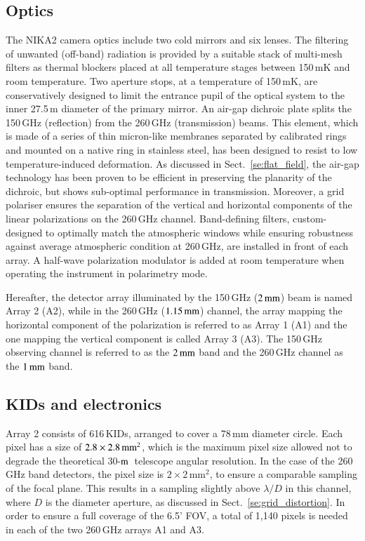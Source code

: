 \documentclass[traditionalabstract]{aa}
\newcommand{\trentemetre}{30-$\rm{m}$}
\newcommand{\lp}[1]{#1}
\newcommand{\rev}[1]{#1}
\begin{document}
\subsection{Optics}
\label{se:instru_optics}
The NIKA2 camera optics include two cold mirrors and six lenses. The
filtering of unwanted (off-band) radiation is provided by a suitable stack of
multi-mesh filters {\lp as thermal blockers} placed at all temperature
stages between 150\,mK and room temperature. {\lp Two aperture stops,
at a temperature of 150\,mK, are conservatively designed to limit the
entrance pupil of the optical system to the inner 27.5\,m diameter of
the primary mirror. }
An air-gap dichroic plate splits the 150\,GHz (reflection)
from the 260\,GHz (transmission) beams. {\lp This element, which is
made of a series of thin micron-like membranes separated by calibrated
rings and mounted on a native ring in stainless steel, has been designed to
resist to low temperature-induced deformation.}
As discussed in Sect.~\ref{se:flat_field}, the air-gap technology has
been proven to be efficient
in preserving the planarity of the dichroic, but shows sub-optimal
performance in transmission. Moreover, a grid polariser ensures the
separation of the vertical and horizontal components of the linear
polarizations on the 260\,GHz channel. Band-defining filters,
custom-designed to optimally match the atmospheric windows while
ensuring robustness against average atmospheric condition at 260\,GHz,
are installed in front of each array. A half-wave polarization
modulator is added at room temperature when operating the instrument
in polarimetry mode.

Hereafter, the detector array illuminated by the 150\,GHz
($2\, \rm{mm}$) beam is named Array 2 (A2), 
while in the 260\,GHz ($1.15\, \rm{mm}$) channel, the array mapping the
horizontal component of the polarization is referred to as Array 1 (A1)
and the one mapping the vertical component is called Array 3 (A3). The
150\,GHz observing channel is referred to as the $2\, \rm{mm}$ band
and the 260\,GHz channel as the $1\, \rm{mm}$ band. 

\subsection{KIDs and electronics}
\label{se:array}

Array 2 consists of 616\,KIDs, arranged to cover a 78\,mm diameter
circle. Each pixel has a size of $2.8\times2.8\textrm{\,mm}^2$, which
is the maximum pixel size allowed not to degrade the theoretical
\trentemetre\ telescope angular resolution. In the
case of the 260\,GHz band detectors, the pixel size is $2\times
2\mathrm{\,mm}^2$, to ensure a comparable sampling of the focal
plane. {\rev This results in a sampling slightly above $\lambda/D$ in
this channel, where $D$ is the diameter aperture, as discussed in
Sect.~\ref{se:grid_distortion}.}
In order to ensure a full coverage of the 6.5' FOV, a total of
1,140 pixels is needed in each of the two 260\,GHz arrays A1 and A3. 
\end{document}
